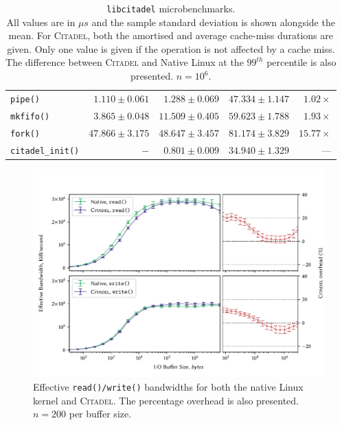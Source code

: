 \begin{table}
{\begin{tabular}{l@{\hskip 0.15in} r@{\hskip 0.4in} r@{\hskip 0.35in} r@{\hskip 0.15in} r}
        \midrule 
        \texttt{pipe()} & $1.110\pm0.061$ & $1.288\pm0.069$ & $47.334\pm1.147$ & $1.02\times$\\
        \texttt{mkfifo()} & $3.865\pm0.048$ & $11.509\pm0.405$ & $59.623\pm1.788$ & $1.93\times$\\

        \midrule 
        \texttt{fork()} & $47.866\pm3.175$ & $48.647\pm3.457$ & $81.174\pm3.829$ & $15.77\times$\\
        \texttt{citadel\_init()} & $-$ & $0.801\pm0.009$ & $34.940\pm1.329$ & ---\\
        \bottomrule
    \end{tabular}
    }
    \vspace{5mm}
    \captionsetup{justification=centering}
    \caption[\texttt{libcitadel} microbenchmarks]{\texttt{libcitadel} microbenchmarks. \\ All values are in $\mu s$ and the sample standard deviation is shown alongside the mean. For \textsc{Citadel}, both the amortised and average cache-miss durations are given. Only one value is given if the operation is not affected by a cache miss. The difference between \textsc{Citadel} and Native Linux at the $99^{th}$ percentile is also presented. $n=10^6$.}
    \label{table:syscall-microbenchmarks}
\end{table}

\begin{figure}[h]
    \centering
    \includegraphics[width=\linewidth]{figures/graphs/io.pdf}
    \vspace{-5mm}
    \captionsetup{justification=centering}
    \caption[Effective \texttt{read()/write()} bandwidths for both the native Linux kernel and \textsc{Citadel}.]{Effective \texttt{read()/write()} bandwidths for both the native Linux kernel and \textsc{Citadel}. The percentage overhead is also presented. $n=200$ per buffer size.}
    \label{fig:io-graph}
\end{figure}

